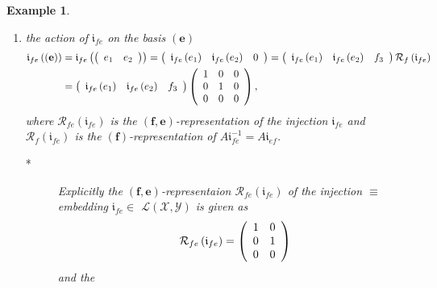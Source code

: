 \documentclass[aps,preprint]{revtex4}%
\newtheorem{example}[theorem]{Example}
\begin{document}
\begin{example}
\begin{enumerate}
\begin{enumerate}
\item the action of $\mathfrak{i}_{fe}$ on the basis $\left(  \mathbf{e}%
\right)  $
\begin{align}
\mathfrak{i}_{fe}\left(  \left(  \mathbf{e}\right)  \right)   &
=\mathfrak{i}_{fe}\left(  \left(
\begin{array}
[c]{cc}%
e_{1} & e_{2}%
\end{array}
\right)  \right)  =\left(
\begin{array}
[c]{ccc}%
\mathfrak{i}_{fe}\left(  e_{1}\right)  & \mathfrak{i}_{fe}\left(  e_{2}\right)
& 0
\end{array}
\right)  =\left(
\begin{array}
[c]{ccc}%
\mathfrak{i}_{fe}\left(  e_{1}\right)  & \mathfrak{i}_{fe}\left(  e_{2}\right)
& f_{3}%
\end{array}
\right)  \mathcal{R}_{f}\left(  \mathfrak{i}_{fe}\right) \\
&  =\left(
\begin{array}
[c]{ccc}%
\mathfrak{i}_{fe}\left(  e_{1}\right)  & \mathfrak{i}_{fe}\left(  e_{2}\right)
& f_{3}%
\end{array}
\right)  \left(
\begin{array}
[c]{ccc}%
1 & 0 & 0\\
0 & 1 & 0\\
0 & 0 & 0
\end{array}
\right)  ,
\end{align}
where $\mathcal{R}_{fe}\left(  \mathfrak{i}_{fe}\right)  $ is the $\left(
\mathbf{f},\mathbf{e}\right)  $-representation of the injection $\mathfrak{i}%
_{fe}$ and $\mathcal{R}_{f}\left(  \mathfrak{i}_{fe}\right)  $ is the $\left(
\mathbf{f}\right)  $-representation of $A\mathfrak{i}_{fe}^{-1}=A\mathfrak{i}%
_{ef}$.

\begin{description}
\item[*] Explicitly the $\left(  \mathbf{f},\mathbf{e}\right)  $-representaion
$\mathcal{R}_{fe}\left(  \mathfrak{i}_{fe}\right)  $ of the injection $\equiv$
embedding $\mathfrak{i}_{fe}\in$ $\mathcal{L}\left(  \mathcal{X}%
,\mathcal{Y}\right)  $ is given as
\begin{equation}
\mathcal{R}_{fe}\left(  \mathfrak{i}_{fe}\right)  =\left(
\begin{array}
[c]{cc}%
1 & 0\\
0 & 1\\
0 & 0
\end{array}
\right)
\end{equation}
and the


\end{description}
\end{enumerate}
\end{enumerate}
\end{example}
\end{document}
